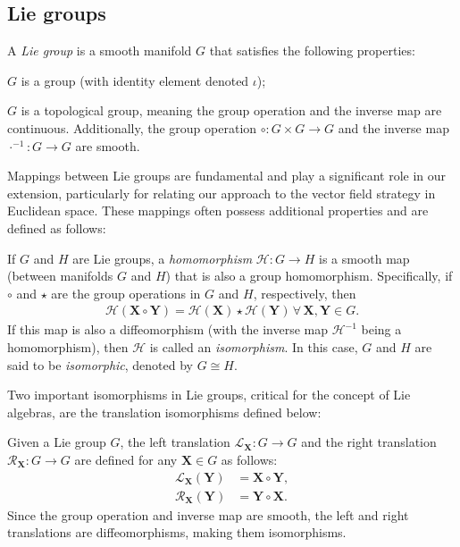 \subsection{Lie groups}
\begin{definition}
    A \emph{Lie group} is a smooth manifold $G$ that satisfies the following properties:
    \begin{property}
        \item $G$ is a group (with identity element denoted $\iota$);
        \item $G$ is a topological group, meaning the group operation and the inverse map are continuous. Additionally, the group operation $\circ: G\times G\to G$ and the inverse map $\cdot^{-1}: G\to G$ are smooth.
    \end{property}
\end{definition}

Mappings between Lie groups are fundamental and play a significant role in our extension, particularly for relating our approach to the vector field strategy in Euclidean space. These mappings often possess additional properties and are defined as follows:
\begin{definition}
    If $G$ and $H$ are Lie groups, a \emph{homomorphism} $\mathcal{H}: G\to H$ is a smooth map (between manifolds $G$ and $H$) that is also a group homomorphism. Specifically, if $\circ$ and $\star$ are the group operations in $G$ and $H$, respectively, then
    \begin{align*}
        \mathcal{H}(\mathbf{X}\circ\mathbf{Y}) = \mathcal{H}(\mathbf{X})\star\mathcal{H}(\mathbf{Y})\,\forall\,\mathbf{X},\mathbf{Y}\in G.
    \end{align*}
    If this map is also a diffeomorphism (with the inverse map $\mathcal{H}^{-1}$ being a homomorphism), then $\mathcal{H}$ is called an \emph{isomorphism}. In this case, $G$ and $H$ are said to be \emph{isomorphic}, denoted by $G\cong H$.
\end{definition}

Two important isomorphisms in Lie groups, critical for the concept of Lie algebras, are the translation isomorphisms defined below:
\begin{definition}
    Given a Lie group $G$, the left translation $\mathcal{L}_{\mathbf{X}}: G\to G$ and the right translation $\mathcal{R}_{\mathbf{X}}: G\to G$ are defined for any $\mathbf{X}\in G$ as follows:
    \begin{align}
        \mathcal{L}_{\mathbf{X}}(\mathbf{Y}) &= \mathbf{X}\circ\mathbf{Y},\\
        \mathcal{R}_{\mathbf{X}}(\mathbf{Y}) &= \mathbf{Y}\circ\mathbf{X}.
    \end{align}
    Since the group operation and inverse map are smooth, the left and right translations are diffeomorphisms, making them isomorphisms.
\end{definition}

